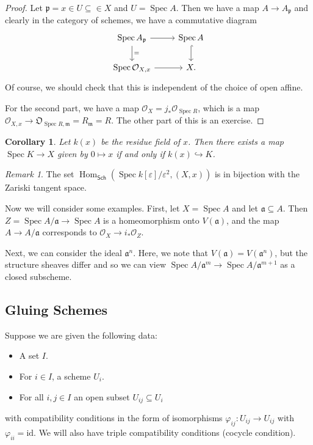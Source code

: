 \documentclass[leqno, openany]{memoir}
\newtheorem{cor}[thm]{Corollary}
\theoremstyle{definition}
\theoremstyle{remark}
\newtheorem{rmk}[thm]{Remark}
\theoremstyle{plain}
\theoremstyle{definition}
\theoremstyle{remark}
\newcommand{\ep}{\varepsilon}
\newcommand{\mc}[1]{\mathcal{#1}}
\newcommand{\mf}[1]{\mathfrak{#1}}
\newcommand{\mr}[1]{\mathrm{#1}}
\newcommand{\ms}[1]{\mathsf{#1}}
\DeclareMathOperator{\Hom}{Hom}
\DeclareMathOperator{\Spec}{Spec}
\begin{document}
\begin{proof} Let $\mf{p} = x \in U \subseteq \in X$ and $U = \Spec A$. Then we
    have a map $A \to A_{\mf{p}}$ and clearly in the category of schemes, we
    have a commutative diagram \begin{equation*} \begin{tikzcd} \Spec
        A_{\mf{p}} \arrow{r} \arrow{d}{=} & \Spec A \arrow[hookrightarrow]{d}
        \\ \Spec \mc{O}_{X,x} \arrow{r} & X.  \end{tikzcd} \end{equation*} Of
        course, we should check that this is independent of the choice of open
        affine.

    For the second part, we have a map $\mc{O}_{X} = j_* \mc{O}_{\Spec R}$,
which is a map $\mc{O}_{X,x} \to \mf{O}_{\Spec R, \mf{m}} = R_{\mf{m}} = R$.
The other part of this is an exercise.  \end{proof}

\begin{cor} Let $k(x)$ be the residue field of $x$. Then there exists a map
$\Spec K \to X$ given by $0 \mapsto x$ if and only if $k(x) \hookrightarrow K$.
\end{cor}

\begin{rmk} The set $\Hom_{\ms{Sch}}(\Spec k[\ep]/\ep^2, (X, x))$ is in
bijection with the Zariski tangent space.  \end{rmk}

Now we will consider some examples. First, let $X = \Spec A$ and let $\mf{a}
\subseteq A$. Then $Z = \Spec A/\mf{a} \to \Spec A$ is a homeomorphism onto
$V(\mf{a})$, and the map $A \to A/\mf{a}$ corresponds to $\mc{O}_X \to i_*
\mc{O}_Z$.

Next, we can consider the ideal $\mf{a}^n$. Here, we note that $V(\mf{a}) =
V(\mf{a}^n)$, but the structure sheaves differ and so we can view $\Spec
A/\mf{a}^m \to \Spec A/\mf{a}^{m+1}$ as a closed subscheme.

\subsection{Gluing Schemes}%

Suppose we are given the following data: \begin{itemize} \item A set $I$.
\item For $i \in I$, a scheme $U_i$.  \item For all $i,j \in I$ an open subset
$U_{ij} \subseteq U_i$ \end{itemize} with compatibility conditions in the form
of isomorphisms $\varphi_{ij} \colon U_{ij} \to U_{ij}$ with $\varphi_{ii} =
\mr{id}$. We will also have triple compatibility conditions (cocycle
condition).
\end{document}

